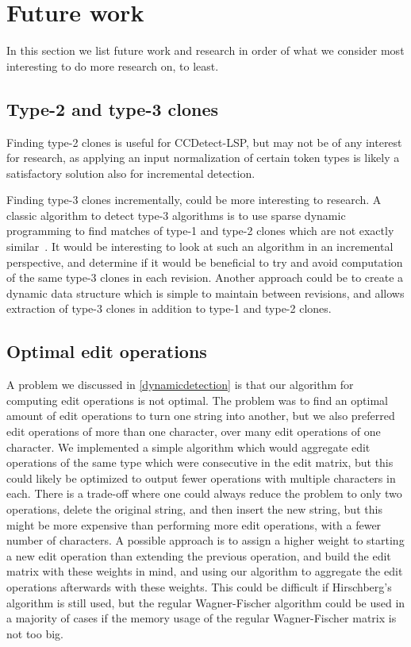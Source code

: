 \section{Future work}

In this section we list future work and research in order of what we consider
most interesting to do more research on, to least.

\subsection*{Type-2 and type-3 clones}

Finding type-2 clones is useful for CCDetect-LSP, but may not be of any interest for
research, as applying an input normalization of certain token types is likely a
satisfactory solution also for incremental detection.

Finding type-3 clones incrementally, could be more interesting to research. A classic
algorithm to detect type-3 algorithms is to use sparse dynamic programming to find matches
of type-1 and type-2 clones which are not exactly
similar~\cite{BakerSparseDynamicProgramming}. It would be interesting to look at such an
algorithm in an incremental perspective, and determine if it would be beneficial to try
and avoid computation of the same type-3 clones in each revision. Another approach could
be to create a dynamic data structure which is simple to maintain between revisions, and
allows extraction of type-3 clones in addition to type-1 and type-2 clones. 


\subsection*{Optimal edit operations}

A problem we discussed in \cref{dynamicdetection} is that our algorithm for computing edit
operations is not optimal. The problem was to find an optimal amount of edit operations to
turn one string into another, but we also preferred edit operations of more than one
character, over many edit operations of one character. We implemented a simple algorithm
which would aggregate edit operations of the same type which were consecutive in the edit
matrix, but this could likely be optimized to output fewer operations with multiple
characters in each. There is a trade-off where one could always reduce the problem to only
two operations, delete the original string, and then insert the new string, but this might
be more expensive than performing more edit operations, with a fewer number of characters.
A possible approach is to assign a higher weight to starting a new edit operation than
extending the previous operation, and build the edit matrix with these weights in mind,
and using our algorithm to aggregate the edit operations afterwards with these weights.
This could be difficult if Hirschberg's algorithm is still used, but the regular
Wagner-Fischer algorithm could be used in a majority of cases if the memory usage of the
regular Wagner-Fischer matrix is not too big.

